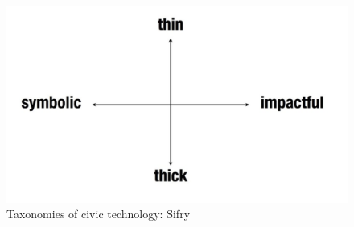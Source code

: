 \begin{figure}[h]
  \centering
  \includegraphics[scale=0.4]{images/taxonomy-sifry}
  \caption{Taxonomies of civic technology: Sifry}
  \label{fig:taxonomy-sifry}
\end{figure}